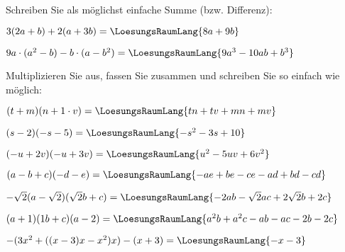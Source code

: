 
Schreiben Sie als möglichst einfache Summe (bzw. Differenz):
\begin{bbwAufgabenBlock}
\item $3(2a+b) + 2(a+3b)=\LoesungsRaumLang{8a+9b}$
\item $9a\cdot{}(a^2-b)-b\cdot{}(a-b^2) = \LoesungsRaumLang{9a^3 - 10ab + b^3}$
\end{bbwAufgabenBlock}
\newpage


Multiplizieren Sie aus, fassen Sie zusammen und schreiben Sie so
einfach wie möglich:
\begin{bbwAufgabenBlock}
\item $(t+m)(n+1\cdot{}v)=\LoesungsRaumLang{tn+tv+mn+mv}$
\item $(s-2)(-s-5) =\LoesungsRaumLang{-s^2-3s+10}$
\item $(-u+2v)(-u+3v) = \LoesungsRaumLang{u^2-5uv +6v^2}$
\item $(a-b+c)(-d-e)=\LoesungsRaumLang{-ae+be-ce-ad+bd-cd}$\newpage
\item $-\sqrt{2}(a-\sqrt{2})(\sqrt{2}b + c) =\LoesungsRaumLang{-2ab- \sqrt{2}ac + 2\sqrt{2}b +2c}$
\item $(a+1)(1b+c)(a-2) = \LoesungsRaumLang{a^2b+a^2c-ab-ac-2b-2c}$
\item $-(3x^2+((x-3)x-x^2)x)-(x+3) = \LoesungsRaumLang{-x-3}$
\end{bbwAufgabenBlock} 


